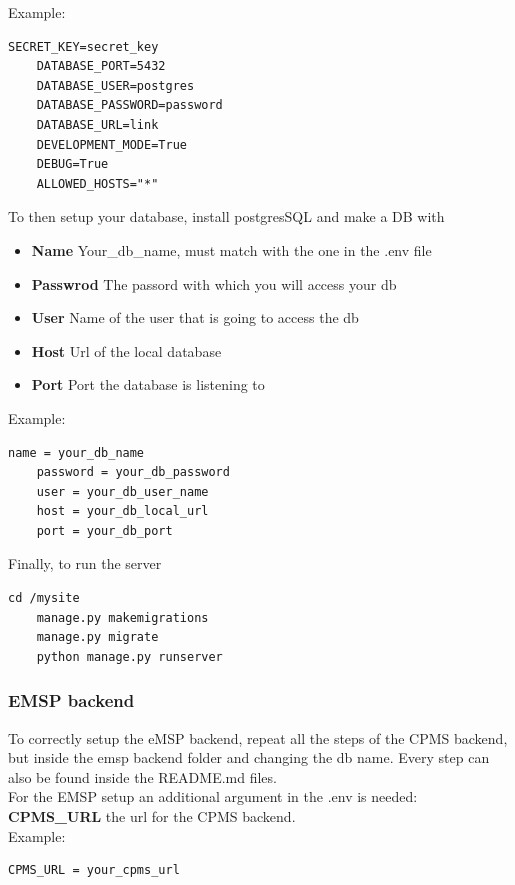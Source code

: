 \documentclass[table, 12pt]{article}
\begin{document}
Example:
\begin{lstlisting}[language=shell]
    SECRET_KEY=secret_key
    DATABASE_PORT=5432
    DATABASE_USER=postgres
    DATABASE_PASSWORD=password
    DATABASE_URL=link
    DEVELOPMENT_MODE=True
    DEBUG=True
    ALLOWED_HOSTS="*"
\end{lstlisting}

\newpage
To then setup your database, install postgresSQL and make a DB with
\begin{itemize}
    \item  \textbf{Name} Your\_db\_name, must match with the one in the .env file
    \item  \textbf{Passwrod} The passord with which you will access your db 
    \item  \textbf{User} Name of the user that is going to access the db
    \item  \textbf{Host} Url of the local database
    \item  \textbf{Port} Port the database is listening to
\end{itemize}
Example:
\begin{lstlisting}[language=shell]
    name = your_db_name
    password = your_db_password
    user = your_db_user_name
    host = your_db_local_url
    port = your_db_port
\end{lstlisting}


Finally, to run the server
\begin{lstlisting}[language=shell]
    cd /mysite
    manage.py makemigrations
    manage.py migrate
    python manage.py runserver
\end{lstlisting}


\subsubsection{EMSP backend}
To correctly setup the eMSP backend, repeat all the steps of the CPMS backend, but inside the emsp backend folder and changing the db name.
Every step can also be found inside the README.md files.\\
For the EMSP setup an additional argument in the .env is needed:\\
\textbf{CPMS\_URL} the url for the CPMS backend.\\
Example:
\begin{lstlisting}[language=shell]
    CPMS_URL = your_cpms_url
\end{lstlisting}
\end{document}
